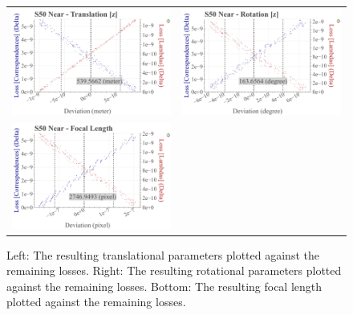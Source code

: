 \begin{figure}[!ht]
\begin{tabular}{cc}
    \includegraphics[width=0.45 \linewidth]{diagrams/calibration/s50_s_near/parameters.csv/Translation[z]_vs_Loss[Correspondences]_vs_Loss[Lambdas]_cluster_All.png} &
    \includegraphics[width=0.45 \linewidth]{diagrams/calibration/s50_s_near/parameters.csv/Rotation[z]_vs_Loss[Correspondences]_vs_Loss[Lambdas]_cluster_All.png} \\

    \includegraphics[width=0.45 \linewidth]{diagrams/calibration/s50_s_near/parameters.csv/FocalLength_vs_Loss[Correspondences]_vs_Loss[Lambdas]_cluster_All.png} &
\end{tabular}
\caption{
  Left: The resulting translational parameters plotted against the remaining losses. 
  Right: The resulting rotational parameters plotted against the remaining losses.
  Bottom: The resulting focal length  plotted against the remaining losses.
     }
\label{fig:static_calibration_algorithmic_error_s50_s_near}
\end{figure}
